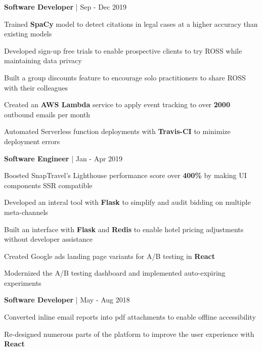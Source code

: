 \begin{cventries}

\cventry
{\textbf{Software Developer} | \color{awesome}{ROSS Intelligence}}
{Sep - Dec 2019} %
{ %
\begin{cvitems}
\item {Trained \textbf{SpaCy} model to detect citations in legal cases at a higher accuracy than existing models}
\item {Developed sign-up free trials to enable prospective clients to try ROSS while maintaining data privacy}
\item {Built a group discounts feature to encourage solo practitioners to share ROSS with their colleagues}
\item {Created an \textbf{AWS Lambda} service to apply event tracking to over \textbf{2000} outbound emails per month}
\item {Automated Serverless function deployments with \textbf{Travis-CI} to minimize deployment errors}
\end{cvitems}
}


\cventry
{\textbf{Software Engineer} | \color{awesome}{SnapTravel}}
{Jan - Apr 2019} %
{ %
\begin{cvitems}
\item {Boosted SnapTravel's Lighthouse performance score over \textbf{400\%} by making UI components SSR compatible}
\item {Developed an interal tool with \textbf{Flask} to simplify and audit bidding on multiple meta-channels}
\item {Built an interface with \textbf{Flask} and \textbf{Redis} to enable hotel pricing adjustments without developer assistance}
\item {Created Google ads landing page variants for A/B testing in \textbf{React}}
\item {Modernized the A/B testing dashboard and implemented auto-expiring experiments}
\end{cvitems}
}


\cventry
{\textbf{Software Developer} | \color{awesome}{TemboSocial}}
{May - Aug 2018} %
{ %
\begin{cvitems}
\item {Converted inline email reports into pdf attachments to enable offline accessibility}
\item {Re-designed numerous parts of the platform to improve the user experience with \textbf{React}}
\end{cvitems}
}


\end{cventries}
